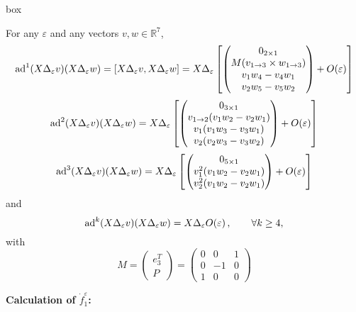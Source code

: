 \documentclass[a4paper,twoside]{article}
\def \ad {\textnormal{ad}}
\def \RR {{\mathbb R}}
\def \eps {\varepsilon}
\begin{document}
\begin{boxitpara}{box}
\begin{lemma}
\label{lem0}
For any $\eps$ and  any vectors $v,w \in \RR^7$,
\begin{equation}
\label{lem0-ad1}
\ad^1(X \Delta_\eps v) (X \Delta_\eps w)=  [X \Delta_\eps v, X \Delta_\eps w] = X \Delta_\eps \left[
\begin{pmatrix}
0_{2 \times 1} \\
M (v_{1\rightarrow 3} \times w_{1\rightarrow 3}) \\
v_1 w_4 -v_4 w_1 \\
v_2 w_5 -v_5 w_2
\end{pmatrix} + O(\eps)
\right]
\end{equation}
\begin{equation}
\label{lem0-ad2}
\ad^2(X \Delta_\eps v) (X \Delta_\eps w) = X  \Delta_\eps \left[
\begin{pmatrix}
0_{3 \times 1} \\
v_{1\rightarrow2}(v_1 w_2-v_2 w_1) \\
v_1(v_1 w_3-v_3 w_1) \\
v_2(v_2 w_3-v_3 w_2)
\end{pmatrix}
+ O(\eps)
\right]
\end{equation}
\begin{equation}
\label{lem0-ad3}
\ad^3(X \Delta_\eps v) (X \Delta_\eps w) = X  \Delta_\eps \left[
\begin{pmatrix}
0_{5 \times 1} \\
v_1^2(v_1 w_2-v_2 w_1) \\
v_2^2(v_1 w_2-v_2 w_1)
\end{pmatrix} 
+ O(\eps)
\right]
\end{equation}
and 
\begin{equation}
\label{lem0-adk}
\ad^k(X \Delta_\eps v) (X \Delta_\eps w) = X  \Delta_\eps O(\eps) \, , \qquad \forall k \geq 4,
\end{equation}
with
\[
 M= \begin{pmatrix}
e_3^T \\
P
\end{pmatrix} = 
\begin{pmatrix}
0 & 0 & 1 \\
 0 & -1 & 0 \\
1 & 0 & 0
\end{pmatrix}
\]
\end{lemma}
\end{boxitpara}
\noindent \textbf{Calculation of $ \dot f_1^\eps$:} 
\end{document}
